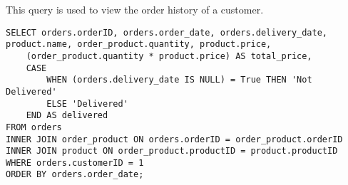 This query is used to view the order history of a customer.

\begin{lstlisting}
SELECT orders.orderID, orders.order_date, orders.delivery_date, product.name, order_product.quantity, product.price,
    (order_product.quantity * product.price) AS total_price,
    CASE
        WHEN (orders.delivery_date IS NULL) = True THEN 'Not Delivered'
        ELSE 'Delivered'
    END AS delivered
FROM orders
INNER JOIN order_product ON orders.orderID = order_product.orderID
INNER JOIN product ON order_product.productID = product.productID
WHERE orders.customerID = 1
ORDER BY orders.order_date;
\end{lstlisting}